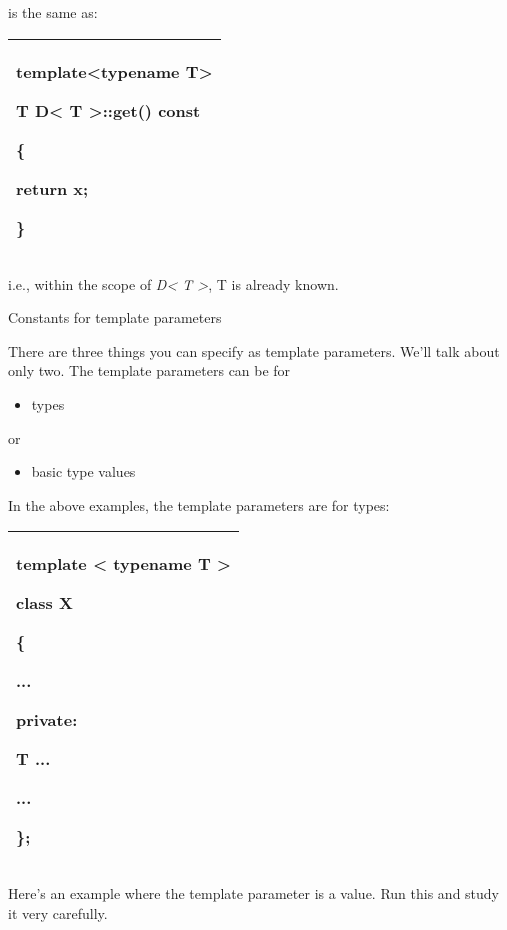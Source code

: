 \documentclass[
]{article}
\providecommand{\tightlist}{%
  \setlength{\itemsep}{0pt}\setlength{\parskip}{0pt}}
\begin{document}
is the same as:

\begin{longtable}[]{@{}l@{}}
\toprule
\endhead
\begin{minipage}[t]{0.97\columnwidth}\raggedright
template\textless typename T\textgreater{}

T D\textless{} T \textgreater::get() const

\{

return x;

\}\strut
\end{minipage}\tabularnewline
\bottomrule
\end{longtable}

i.e., within the scope of \emph{D\textless{} T \textgreater{}}, T is
already known.

Constants for template parameters

There are three things you can specify as template parameters. We'll
talk about only two. The template parameters can be for

\begin{itemize}
\tightlist
\item
  types
\end{itemize}

or

\begin{itemize}
\tightlist
\item
  basic type values
\end{itemize}

In the above examples, the template parameters are for types:

\begin{longtable}[]{@{}l@{}}
\toprule
\endhead
\begin{minipage}[t]{0.97\columnwidth}\raggedright
template \textless{} typename T \textgreater{}

class X

\{

...

private:

T ...

...

\};\strut
\end{minipage}\tabularnewline
\bottomrule
\end{longtable}

Here's an example where the template parameter is a value. Run this and
study it very carefully.
\end{document}
